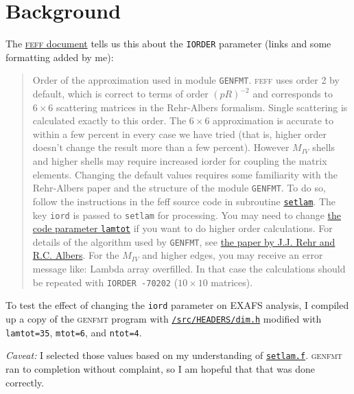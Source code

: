 \documentclass{article}
\begin{document}
\appendix


\section{Background}


The
\href{http://leonardo.phys.washington.edu/feff/wiki/static/i/o/r/IORDER_326d.html}%
{\textsc{feff} document} tells us this about the \texttt{IORDER} parameter
(links and some formatting added by me):

\begin{quote}
  Order of the approximation used in module \texttt{GENFMT}.
  \textsc{feff} uses order 2 by default, which is correct to terms of
  order $(pR)^{-2}$ and corresponds to $6\times6$ scattering matrices
  in the Rehr-Albers formalism.  Single scattering is calculated
  exactly to this order.  The $6\times6$ approximation is accurate to
  within a few percent in every case we have tried (that is, higher
  order doesn’t change the result more than a few percent). However
  $M_{IV}$ shells and higher shells may require increased iorder for
  coupling the matrix elements.  Changing the default values requires
  some familiarity with the Rehr-Albers paper and the structure of the
  module \texttt{GENFMT}.  To do so, follow the instructions in the
  feff source code in subroutine
  \href{https://github.com/xraypy/feff85exafs/blob/master/src/GENFMT/setlam.f}%
  {\texttt{setlam}}.  The key \texttt{iord} is passed to
  \texttt{setlam} for processing.  You may need to change
  \href{https://github.com/xraypy/feff85exafs/blob/master/src/HEADERS/dim.h#L37}%
  {the code parameter \texttt{lamtot}} if you want to do higher order
  calculations.  For details of the algorithm used by \texttt{GENFMT},
  see \href{http://dx.doi.org/10.1103/PhysRevB.41.8139}%
  {the paper by J.J. Rehr and R.C. Albers}. For the $M_{IV}$ and
  higher edges, you may receive an error message like: Lambda array
  overfilled. In that case the calculations should be repeated with
  \texttt{IORDER -70202} ($10\times10$ matrices).
\end{quote}

To test the effect of changing the \texttt{iord} parameter on EXAFS
analysis, I compiled up a copy of the \textsc{genfmt} program with 
\href{https://github.com/xraypy/feff85exafs/blob/master/src/HEADERS/dim.h}%
{\texttt{/src/HEADERS/dim.h}} modified with \texttt{lamtot=35},
\texttt{mtot=6}, and \texttt{ntot=4}.

\textit{Caveat:} I selected those values based on my understanding of
\href{https://github.com/xraypy/feff85exafs/blob/master/src/GENFMT/setlam.f}%
{\texttt{setlam.f}}.  \textsc{genfmt} ran to completion without
complaint, so I am hopeful that that was done correctly.
\end{document}
